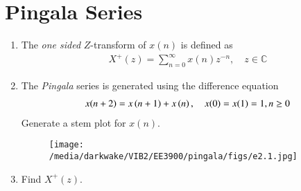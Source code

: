 \documentclass[journal,12pt,twocolumn]{IEEEtran}
\renewcommand\thesection{\arabic{section}}
\begin{document}
\section{Pingala Series}
\begin{enumerate}[label=\thesection.\arabic*,ref=\thesection.\theenumi]
\item The {\em one sided} $Z$-transform of $x(n)$ is defined as 
\begin{align}
	X^{+}(z) = \sum_{n = 0}^{\infty}x(n)z^{-n}, \quad z \in \mathbb{C}
	\label{eq:one-Z}
\end{align}


\item The {\em Pingala} series is generated using the difference equation 
\begin{align}
	x(n+2) = x\left(n+1\right) + x\left(n\right),  \quad x(0) = x(1) = 1, n \ge 0
	\label{eq:1-pingala}
\end{align}
Generate a stem plot for $x(n)$.\\
\solution
\begin{figure}[!ht]
	\texttt{[image: /media/darkwake/VIB2/EE3900/pingala/figs/e2.1.jpg]}
		\label{fig:bn}
\end{figure}

\item 		Find $X^{+}(z)$.


\end{enumerate}
\end{document}
